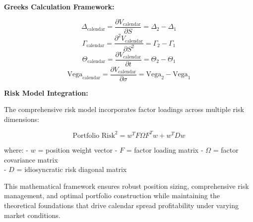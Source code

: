 \documentclass[
  american,
  11pt,
  11pt,
  letterpaper,
  onecolumn]{article}
\begin{document}
\textbf{Greeks Calculation Framework:}

\[\Delta_{\text{calendar}} = \frac{\partial V_{\text{calendar}}}{\partial S} = \Delta_2 - \Delta_1\]
\[\Gamma_{\text{calendar}} = \frac{\partial^2 V_{\text{calendar}}}{\partial S^2} = \Gamma_2 - \Gamma_1\]
\[\Theta_{\text{calendar}} = \frac{\partial V_{\text{calendar}}}{\partial t} = \Theta_2 - \Theta_1\]
\[\text{Vega}_{\text{calendar}} = \frac{\partial V_{\text{calendar}}}{\partial \sigma} = \text{Vega}_2 - \text{Vega}_1\]

\textbf{Risk Model Integration:}

The comprehensive risk model incorporates factor loadings across
multiple risk dimensions:

\[\text{Portfolio Risk}^2 = w^T F \Omega F^T w + w^T D w\]

where: - \(w\) = position weight vector - \(F\) = factor loading matrix
- \(Ω\) = factor covariance matrix\\
- \(D\) = idiosyncratic risk diagonal matrix

This mathematical framework ensures robust position sizing,
comprehensive risk management, and optimal portfolio construction while
maintaining the theoretical foundations that drive calendar spread
profitability under varying market conditions.


\printbibliography
\end{document}
